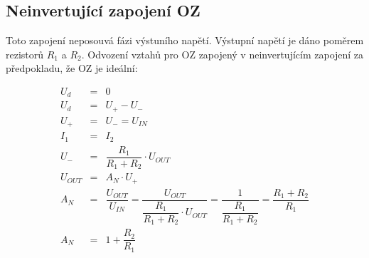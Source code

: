   \subsection{Neinvertující zapojení OZ}
    \indent\indent
    Toto zapojení neposouvá fázi výstuního napětí. Výstupní napětí je dáno poměrem rezistorů $R_1$ a $R_2$. Odvození vztahů pro OZ zapojený v neinvertujícím zapojení za předpokladu, že OZ je ideální:
    
    \begin{eqnarray}
      U_d &=& 0 \nonumber\\
      U_d &=& U_+ - U_- \nonumber\\      
      U_+ &=& U_- = U_{IN} \nonumber\\
      I_1 &=& I_2 \nonumber\\
      U_- &=& \dfrac{R_1}{R_1+R_2}\cdot U_{OUT} \nonumber\\
      U_{OUT} &=& A_N \cdot U_+ \nonumber\\      
      A_N &=& \dfrac{U_{OUT}}{U_{IN}} = \dfrac{U_{OUT}}{\dfrac{R_1}{R_1+R_2}\cdot U_{OUT}} = \dfrac{1}{\dfrac{R_1}{R_1+R_2}} = \dfrac{R_1+R_2}{R_1}\nonumber\\
      A_N &=& 1+\dfrac{R_2}{R_1}
    \end{eqnarray}
    

